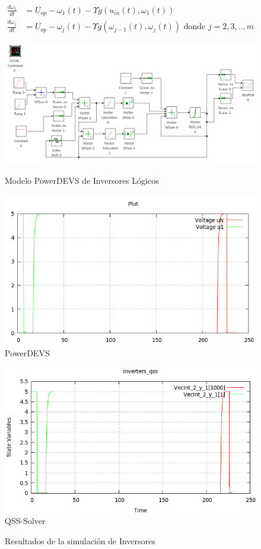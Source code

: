 \begin{align*}
\frac{d \omega_1}{d t} & = U_{op} - \omega_1(t) - \Upsilon g (u_{in}(t), \omega_{1} (t))    \\
\frac{d \omega_j}{d t} & = U_{op} - \omega_j(t) - \Upsilon g (\omega_{j-1}(t), \omega_{j} (t)) \textrm{ donde $j = 2, 3, .., m$}
\end{align*}


\begin{figure}[H]
\includegraphics[width=0.75\linewidth]{inverters}
\label{model:inverters}
\caption{Modelo PowerDEVS de Inversores Lógicos}
\end{figure}

\begin{figure}[H]
\centering
\begin{minipage}{0.5\textwidth}
 \includegraphics[width=\linewidth]{inversers-pd}
PowerDEVS
\end{minipage}\hfill
\begin{minipage}{0.5\textwidth}
 \includegraphics[width=\linewidth]{inversers-qss}
QSS-Solver
\end{minipage}
\caption{Resultados de la simulación de Inversores}
\label{graph:inverters}
\end{figure}

